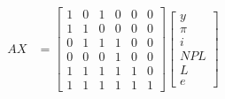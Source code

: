 \documentclass[
]{book}
\begin{document}
\begin{eqnarray}
AX&=\begin{bmatrix}
1 & 0 & 1 & 0 & 0 & 0  \\
1 & 1 & 0 & 0 & 0 & 0 \\
0 & 1 & 1 & 1 & 0 & 0 \\
0 & 0 & 0 & 1 & 0 & 0 \\
1 & 1 & 1 & 1 & 1 & 0 \\
1 & 1 & 1 & 1 & 1 & 1 \end{bmatrix}
\begin{bmatrix}
y \\
\pi \\
i\\
NPL\\
L\\
e\end{bmatrix}
\end{eqnarray}

  
\end{document}
